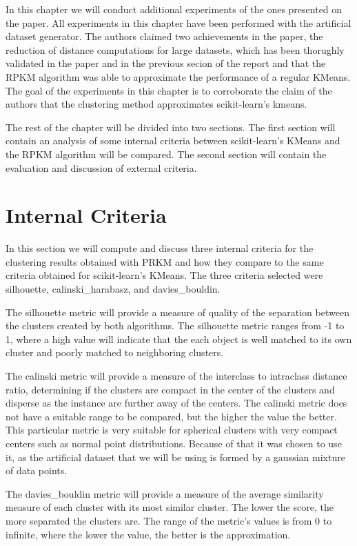 In this chapter we will conduct additional experiments of the ones presented on the paper. All experiments in this chapter have been performed with the artificial dataset generator. The authors claimed two achievements in the paper, the reduction of distance computations for large datasets, which has been thorughly validated in the paper and in the previous secion of the report and that the RPKM algorithm was able to approximate the performance of a regular KMeans. The goal of the experiments in this chapter is to corroborate the claim of the authors that the clustering method approximates scikit-learn's kmeans. 

The rest of the chapter will be divided into two sections. The first section will contain an analysis of some internal criteria between scikit-learn's KMeans and the RPKM algorithm will be compared. The second section will contain the evaluation and discussion of external criteria.

\section{Internal Criteria}

In this section we will compute and discuss three internal criteria for the clustering results obtained with PRKM and how they compare to the same criteria obtained for scikit-learn's KMeans. The three criteria selected were silhouette, calinski\_harabasz, and davies\_bouldin. 

The silhouette metric will provide a measure of quality of the separation between the clusters created by both algorithms. The silhouette metric ranges from -1 to 1, where a high value will indicate that the each object is well matched to its own cluster and poorly matched to neighboring clusters.

The calinski metric will provide a measure of the interclass to intraclass distance ratio, determining if the clusters are compact in the center of the clusters and disperse as the instance are further away of the centers. The calinski metric does not have a suitable range to be compared, but the higher the value the better. This particular metric is very suitable for spherical clusters with very compact centers such as normal point distributions. Because of that it was chosen to use it, as the artificial dataset that we will be using is formed by a gaussian mixture of data points.

The davies\_bouldin metric will provide a measure of the average similarity measure of each cluster with its most similar cluster. The lower the score, the more separated the clusters are. The range of the metric's values is from 0 to infinite, where the lower the value, the better is the approximation.

